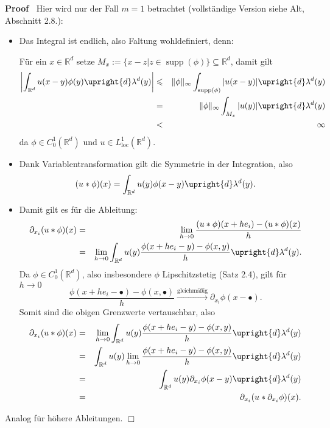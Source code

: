 \documentclass{book}
\newcommand{\assign}{:=}
\newcommand{\nobracket}{}
\newcommand{\tmop}[1]{\ensuremath{\operatorname{#1}}}
\newenvironment{itemizedot}{\begin{itemize} \renewcommand{\labelitemi}{$\bullet$}\renewcommand{\labelitemii}{$\bullet$}\renewcommand{\labelitemiii}{$\bullet$}\renewcommand{\labelitemiv}{$\bullet$}}{\end{itemize}}
\newenvironment{proof}{\noindent\textbf{Proof\ }}{\hspace*{\fill}$\Box$\medskip}
\begin{document}
\begin{proof}
  Hier wird nur der Fall $m = 1$ betrachtet (vollst{\"a}ndige Version siehe
  Alt, Abschnitt 2.8.):
  \begin{itemizedot}
    \item Das Integral ist endlich, also Faltung wohldefiniert, denn:
    
    F{\"u}r ein $x \in \mathbb{R}^d$ setze $M_x \assign \{ x - z | \nobracket
    z \in \tmop{supp} (\phi) \} \subseteq \mathbb{R}^d$, damit gilt
    \begin{eqnarray*}
      \left| \int_{\mathbb{R}^d} u (x - y) \phi (y) \upright{d} \lambda^d (y)
      \right| & \leqslant & \| \phi \|_{\infty} \int_{\tmop{supp} (\phi)} | u
      (x - y) | \upright{d} \lambda^d (y)\\
      & = & \| \phi \|_{\infty} \int_{M_x} | u (y) | \upright{d} \lambda^d
      (y)\\
      & < & \infty
    \end{eqnarray*}
    da $\phi \in C^1_0 (\mathbb{R}^d)$ und $u \in L^1_{\tmop{loc}}
    (\mathbb{R}^d)$.
    
    \item Dank Variablentransformation gilt die Symmetrie in der Integration,
    also
    \[ (u \ast \phi) (x) = \int_{\mathbb{R}^d} u (y) \phi (x - y) \upright{d}
       \lambda^d (y) . \]
    \item Damit gilt es f{\"u}r die Ableitung:
    \begin{eqnarray*}
      \partial_{x_i} (u \ast \phi) (x) & = & \lim_{h \rightarrow 0} \frac{(u
      \ast \phi) (x + h e_i) - (u \ast \phi) (x)}{h}\\
      & = & \lim_{h \rightarrow 0} \int_{\mathbb{R}^d} u (y) \frac{\phi (x +
      h e_i - y) - \phi (x, y)}{h} \upright{d} \lambda^d (y) .
    \end{eqnarray*}
    Da $\phi \in C^1_0 (\mathbb{R}^d)$, also insbesondere $\phi$
    Lipschitzstetig (Satz 2.4), gilt f{\"u}r $h \rightarrow 0$
    \[ \frac{\phi (x + h e_i - \bullet) - \phi (x, \bullet)}{h}
       \xrightarrow{\text{gleichm{\"a}{\ss}ig}} \partial_{x_i} \phi (x -
       \bullet) . \]
    Somit sind die obigen Grenzwerte vertauschbar, also
    \begin{eqnarray*}
      \partial_{x_i} (u \ast \phi) (x) & = & \lim_{h \rightarrow 0}
      \int_{\mathbb{R}^d} u (y) \frac{\phi (x + h e_i - y) - \phi (x, y)}{h}
      \upright{d} \lambda^d (y)\\
      & = & \int_{\mathbb{R}^d} u (y) \lim_{h \rightarrow 0} \frac{\phi (x +
      h e_i - y) - \phi (x, y)}{h} \upright{d} \lambda^d (y)\\
      & = & \int_{\mathbb{R}^d} u (y) \partial_{x_i} \phi (x - y) \upright{d}
      \lambda^d (y)\\
      & = & \partial_{x_i} (u \ast \partial_{x_i} \phi) (x) .
    \end{eqnarray*}
  \end{itemizedot}
  Analog f{\"u}r h{\"o}here Ableitungen. 
\end{proof}
\end{document}
